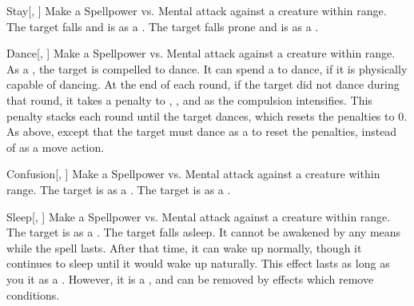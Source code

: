 \begin{ability}[\nth{1}]{Stay}[, ]
Make a Spellpower vs. Mental attack against a creature within \rngmed range.
\hit The target falls  and is  as a .
\crit The target falls prone and is  as a .
\end{ability}
\vspace{0.25em}


\begin{ability}[\nth{2}]{Dance}[, ]
Make a Spellpower vs. Mental attack against a creature within \rngmed range.
\hit As a , the target is compelled to dance.
It can spend a  to dance, if it is physically capable of dancing.
At the end of each round, if the target did not dance during that round, it takes a  penalty to , , and  as the compulsion intensifies.
This penalty stacks each round until the target dances, which resets the penalties to 0.
\crit As above, except that the target must dance as a  to reset the penalties, instead of as a move action.
\end{ability}
\vspace{0.25em}


\begin{ability}[\nth{3}]{Confusion}[, ]
Make a Spellpower vs. Mental attack against a creature within \rngmed range.
\hit The target is \disoriented as a .
\crit The target is \confused as a .
\end{ability}
\vspace{0.25em}


\begin{ability}[\nth{4}]{Sleep}[, ]
Make a Spellpower vs. Mental attack against a creature within \rngmed range.
\hit The target is \blinded as a .
\crit The target falls asleep.
It cannot be awakened by any means while the spell lasts.
After that time, it can wake up normally, though it continues to sleep until it would wake up naturally.
This effect lasts as long as you  it as a .
However, it is a , and can be removed by effects which remove conditions.
\end{ability}
\vspace{0.25em}


